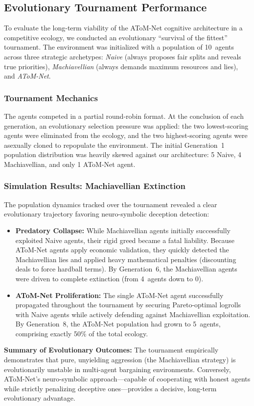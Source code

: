 \documentclass[11pt]{article}
\begin{document}
\subsection{Evolutionary Tournament Performance}
\label{app:tournament}
To evaluate the long-term viability of the AToM-Net cognitive architecture in a competitive
ecology, we conducted an evolutionary ``survival of the fittest'' tournament. The environment
was initialized with a population of 10~agents across three strategic archetypes: \textit{Naive}
(always proposes fair splits and reveals true priorities), \textit{Machiavellian} (always demands
maximum resources and lies), and \textit{AToM-Net}.

\subsubsection{Tournament Mechanics}
The agents competed in a partial round-robin format. At the conclusion of each generation, an
evolutionary selection pressure was applied: the two lowest-scoring agents were eliminated from
the ecology, and the two highest-scoring agents were asexually cloned to repopulate the
environment. The initial Generation~1 population distribution was heavily skewed against our
architecture: 5 Naive, 4 Machiavellian, and only 1 AToM-Net agent.

\subsubsection{Simulation Results: Machiavellian Extinction}
The population dynamics tracked over the tournament revealed a clear evolutionary trajectory
favoring neuro-symbolic deception detection:
\begin{itemize}
    \item \textbf{Predatory Collapse:} While Machiavellian agents initially successfully exploited
          Naive agents, their rigid greed became a fatal liability. Because AToM-Net agents apply
          economic validation, they quickly detected the Machiavellian lies and applied heavy
          mathematical penalties (discounting deals to force hardball terms). By Generation~6, the
          Machiavellian agents were driven to complete extinction (from 4~agents down to 0).
    \item \textbf{AToM-Net Proliferation:} The single AToM-Net agent successfully propagated
          throughout the tournament by securing Pareto-optimal logrolls with Naive agents while
          actively defending against Machiavellian exploitation. By Generation~8, the AToM-Net
          population had grown to 5~agents, comprising exactly 50\% of the total ecology.
\end{itemize}

\medskip\noindent\textbf{Summary of Evolutionary Outcomes:} The tournament empirically
demonstrates that pure, unyielding aggression (the Machiavellian strategy) is evolutionarily
unstable in multi-agent bargaining environments. Conversely, AToM-Net's neuro-symbolic
approach---capable of cooperating with honest agents while strictly penalizing deceptive
ones---provides a decisive, long-term evolutionary advantage.
\end{document}
